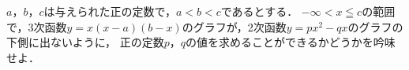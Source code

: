 \documentclass[../../main.tex]{subfiles}
\begin{document}
$a$，$b$，$c$は与えられた正の定数で，$a<b<c$であるとする．
$-\infty < x \leqq c$の範囲で，3次函数$y=x(x-a)(b-x)$のグラフが，2次函数$y=px^2-qx$のグラフの下側に出ないように，
正の定数$p$，$q$の値を求めることができるかどうかを吟味せよ．
\end{document}
